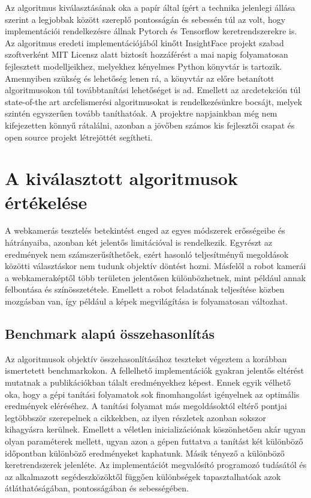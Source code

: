 Az algoritmus kiválasztásának oka a papír által ígért a technika jelenlegi állása szerint a legjobbak között szereplő pontosságán és sebessén túl az volt, hogy implementációi rendelkezésre állnak Pytorch\cite{biubug6_retinaface-pytorch_2021} és Tensorflow\cite{stan_btd_retinaface-tf2_2021} keretrendszerekre is. Az algoritmus eredeti implementációjából kinőtt InsightFace\cite{noauthor_insightface_nodate} projekt szabad szoftverként MIT Licensz alatt biztosít hozzáférést \cite{noauthor_insightface-github_2021} a mai napig folyamatosan fejlesztett modelljeikhez, melyekhez kényelmes Python könyvtár is tartozik. Amennyiben szükség és lehetőség lenen rá, a könyvtár az előre betanított algoritmusokon túl továbbtanítási lehetőséget is ad. Emellett az arcdetekción túl state-of-the art arcfelismerési algoritmusokat is rendelkezésünkre bocsájt, melyek szintén egyszerűen tovább taníthatóak. A projektre napjainkban még nem kifejezetten könnyű rátalálni, azonban a jövőben számos kis fejlesztői csapat és open source projekt létrejöttét segítheti.

\chapter{A kiválasztott algoritmusok értékelése}
A webkamerás tesztelés betekintést enged az egyes módszerek erősségeibe és hátrányaiba, azonban két jelentős limitációval is rendelkezik. Egyrészt az eredmények nem számszerűsíthetőek, ezért hasonló teljesítményű megoldások közötti választáskor nem tudunk objektív döntést hozni. Másfelől a robot kamerái a webkameraképtől több területen jelentősen különbözhetnek, mint például annak felbontása és színösszetétele. Emellett a robot feladatának teljesítése közben mozgásban van, így például a képek megvilágítása is folyamatosan változhat.

\section{Benchmark alapú összehasonlítás}
Az algoritmusok objektív összehasonlításához teszteket végeztem a korábban ismertetett benchmarkokon. A fellelhető implementációk gyakran jelentős eltérést mutatnak a publikációkban tálalt eredményekhez képest. Ennek egyik vélhető oka, hogy a gépi tanítási folyamatok sok finomhangolást igényelnek az optimális eredmények eléréséhez. A tanítási folyamat más megoldásoktól eltérő pontjai legtöbbször szerepelnek a cikkekben, az ilyen részletek azonban sokszor kihagyásra kerülnek. Emellett a véletlen inicializációnak köszönhetően akár ugyan olyan paraméterek mellett, ugyan azon a gépen futtatva a tanítást két különböző időpontban különböző eredményeket kaphatunk. Másik tényező a különböző keretrendszerek jelenléte. Az implementációt megvalósító programozó tudásától és az alkalmazott segédeszközöktől függően különbségek tapasztalhatóak azok átláthatóságában, pontosságában és sebességében.

